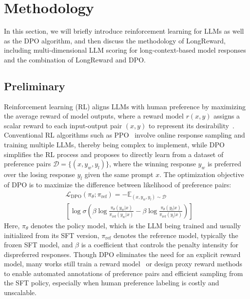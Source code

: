 \section{Methodology}

In this section, we will briefly introduce reinforcement learning for LLMs as well as the DPO algorithm, and then discuss the methodology of LongReward, including multi-dimensional LLM scoring for long-context-based model responses and the combination of LongReward and DPO.

\subsection{Preliminary}
Reinforcement learning (RL) aligns LLMs with human preference by maximizing the average reward of model outputs, where a reward model $r(x,y)$ assigns a scalar reward to each input-output pair $(x, y)$ to represent its desirability~\cite{rlhf, bai2022training, stiennon2020}. Conventional RL algorithms such as PPO~\cite{ppo} involve online response sampling and training multiple LLMs, thereby being complex to implement, while DPO~\cite{dpo} simplifies the RL process and proposes to directly learn from a dataset of preference pairs $\mathcal{D}=\{(x, y_w, y_l)\}$, where the winning response $y_w$ is preferred over the losing response $y_l$ given the same prompt $x$. The optimization objective of DPO is to maximize the difference between likelihood of preference pairs:  
\begin{equation}
\begin{aligned}
&\mathcal{L}_\text{DPO}(\pi_\theta; \pi_\text{ref})= -\mathbb{E}_{(x, y_w, y_l)\sim\mathcal{D}} \\
&[\log\sigma(\beta\log\frac{\pi_\theta(y_w|x)}{\pi_\text{ref}(y_w|x)}-\beta\log\frac{\pi_\theta(y_l|x)}{\pi_\text{ref}(y_l|x)})]
\end{aligned}
\end{equation}
Here, $\pi_\theta$ denotes the policy model, which is the LLM being trained and usually initialized from its SFT version, $\pi_\text{ref}$ denotes the reference model, typically the frozen SFT model, and $\beta$ is a coefficient that controls the penalty intensity for dispreferred responses. Though DPO eliminates the need for an explicit reward model, many works still train a reward model~\cite{rso, rs-dpo, chatglm-rlhf} or design proxy reward methods~\cite{tian2024} to enable automated annotations of preference pairs and efficient sampling from the SFT policy, especially when human preference labeling is costly and unscalable.

